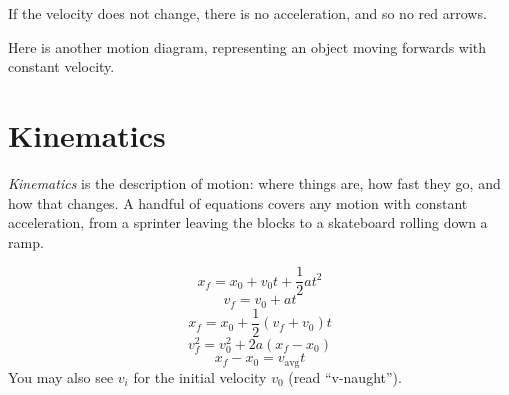 If the velocity does not change, there is no acceleration, and so no red arrows. 
    
Here is another motion diagram, representing an object moving forwards with constant velocity.
\begin{center}
\end{center}



\section{Kinematics}
\emph{Kinematics} is the description of motion: where things are, how fast they go, and how that changes. A handful of equations covers any motion with constant acceleration, from a sprinter leaving the blocks to a skateboard rolling down a ramp.



\begin{mdframed}[frametitle = {Kinematic Equations}, style=important]
\begin{equation} %
    x_f = x_0 + v_0 t + \frac{1}{2}at^2
\end{equation}
\begin{equation} %
    v_f = v_0 + at
\end{equation}
\begin{equation} %
    x_f = x_0 + \frac{1}{2}\left(v_f + v_0 \right)t
\end{equation}
\begin{equation} %
    v_f^2 = v_0^2 + 2a\left(x_f - x_0 \right)
\end{equation}
\begin{equation} %
    x_f - x_0 = v_{\text{avg}}t
\end{equation}
You may also see $v_i$ for the initial velocity $v_0$ (read ``v-naught'').
\end{mdframed}

